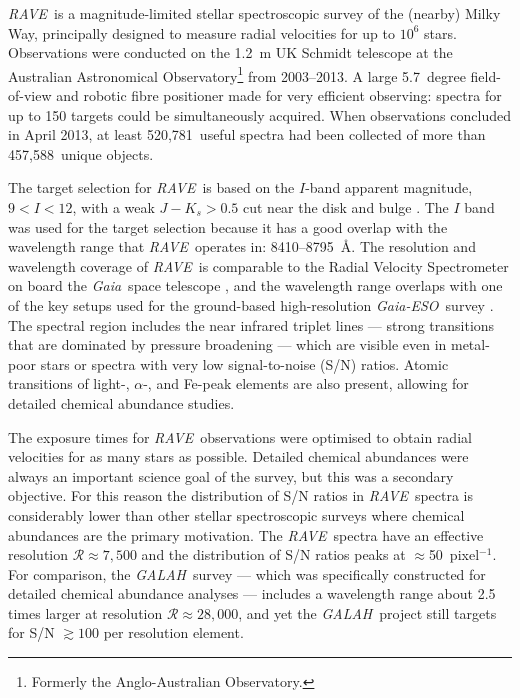 \documentclass[preprint]{aastex}
\newcommand{\acronym}[1]{{\small{#1}}}
\newcommand{\project}[1]{\textsl{#1}}
\newcommand{\gaia}{\project{Gaia}}
\newcommand{\rave}{\project{\acronym{RAVE}}}
\newcommand{\galah}{\project{\acronym{GALAH}}}
\newcommand{\ges}{\project{Gaia-ESO}}
\newcommand{\Nspectra}{520,781}
\newcommand{\Nstars}{457,588}
\begin{document}
\rave\ is a magnitude-limited stellar spectroscopic survey of the (nearby) Milky Way,
principally designed to measure radial velocities for up to $10^6$ stars.
Observations were conducted on the 1.2~m UK Schmidt telescope at the Australian 
Astronomical Observatory\footnote{Formerly the Anglo-Australian Observatory.} from 
2003--2013.  A large 5.7~degree field-of-view and robotic fibre positioner made for 
very efficient observing:  spectra for up to 150 targets could be simultaneously
acquired.  When observations concluded in April 2013, at least \Nspectra\ useful 
spectra had been collected of more than \Nstars\ unique objects. 


The target selection for \rave\ is based on the $I$-band apparent magnitude,
$9 < I < 12$, with a weak $J - K_s > 0.5$ cut near the disk and bulge \citep{Wojno_2016}.  
The $I$ band was used for the target selection because it has a good overlap with the
wavelength range that \rave\ operates in:  8410--8795~\AA.  The resolution and 
wavelength coverage of \rave\ is comparable to the Radial Velocity Spectrometer on
board the \gaia\ space telescope \citep{Munari_2005,Kordopatis_2011},
and the wavelength range overlaps with one of the key setups used for the ground-based 
high-resolution \ges\ survey \citep{Gilmore_2012,Randich_2013}.  The spectral region 
includes the  near infrared triplet lines --- strong transitions that 
are dominated by pressure broadening --- which are visible even in metal-poor stars
or spectra with very low signal-to-noise (S/N) ratios.  Atomic transitions of 
light-, $\alpha$-, and Fe-peak elements are also present, allowing for detailed 
chemical abundance studies.


The exposure times for \rave\ observations were optimised to obtain radial 
velocities for as many stars as possible.  Detailed chemical abundances were
always an important science goal of the survey, but this was a secondary objective.  
For this reason the distribution of S/N ratios in \rave\ spectra is considerably 
lower than other stellar spectroscopic surveys where chemical abundances are the 
primary motivation.  The \rave\ spectra have an effective resolution 
$\mathcal{R} \approx 7{,}500$ and the distribution of S/N ratios peaks at 
$\approx$50~pixel$^{-1}$.  For comparison, the \galah\ survey 
\citep{DeSilva_2015} --- which was specifically constructed for detailed chemical 
abundance analyses --- includes a wavelength range about 2.5 times larger at 
resolution $\mathcal{R} \approx 28{,}000$, and yet the \galah\ project still 
targets for S/N $\gtrsim100$ per resolution element.
\end{document}
